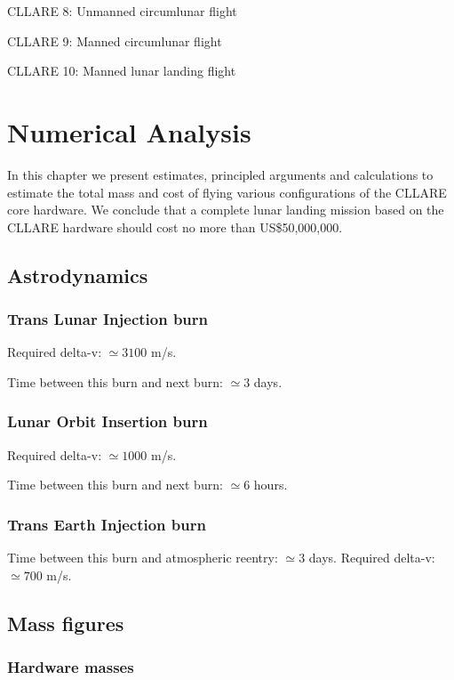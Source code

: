 \documentclass{report}
\begin{document}
CLLARE 8: Unmanned circumlunar flight

CLLARE 9: Manned circumlunar flight

CLLARE 10: Manned lunar landing flight


\chapter{Numerical Analysis} \label{chap:numeric}

In this chapter we present estimates, principled arguments and calculations to estimate the total mass and cost of flying various configurations of the CLLARE core hardware.  We conclude that a complete lunar landing mission based on the CLLARE hardware should cost no more than US\$50,000,000.

\section{Astrodynamics}

\subsection{Trans Lunar Injection burn}

Required delta-v: $\simeq 3100$ m/s.

Time between this burn and next burn: $\simeq 3$ days.

\subsection{Lunar Orbit Insertion burn}

Required delta-v: $\simeq 1000$ m/s.

Time between this burn and next burn: $\simeq 6$ hours.

\subsection{Trans Earth Injection burn}

Time between this burn and atmospheric reentry: $\simeq 3$ days.
Required delta-v: $\simeq 700$ m/s.

\section{Mass figures}

\subsection{Hardware masses}
\end{document}
